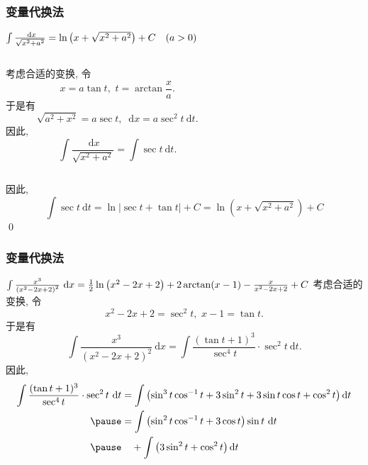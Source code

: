\documentclass[
10pt,
aspectratio=43,
]{beamer}
\begin{document}
\begin{frame}
	\frametitle{变量代换法}
	\everymath{\displaystyle}
	{\small
		\begin{exampleblock}{$\color{black}\int \frac{\mathrm{~d} x}{\sqrt{x^2+a^2}}=\ln \left(x+\sqrt{x^2+a^2}\right)+C \quad(a>0)$}
			\begin{columns}
				\begin{column}{0.4\textwidth}
					\pause 考虑合适的变换, 令
					$$
						x=a \tan t,\,\,t=\arctan\frac{x}{a}.
					$$
					\pause 于是有
					$$
						\sqrt{a^2+x^2} = a\sec t,\,\,\mathrm{~d} x=a \sec ^2 t \mathrm{~d} t.
					$$
					\pause 因此,
					$$
						\int \frac{\mathrm{~d} x}{\sqrt{x^2+a^2}}=\int \sec t \mathrm{~d} t.
					$$
				\end{column}
				\pause 
				\begin{column}{0.5\textwidth}
					\begin{figure}
						\centering
					\end{figure}
				\end{column}
			\end{columns}
			\vspace{0.1cm}
			\pause 
			因此,
			$$
				\int \sec t \mathrm{~d} t= \ln |\sec t+\tan t|+C=\ln \left(x+\sqrt{x^2+a^2}\right)+C
			$$
			\qed
		\end{exampleblock}
	}
\end{frame}

\begin{frame}
	\frametitle{变量代换法}
	\everymath{\displaystyle}
	{\small
		\begin{exampleblock}{$\color{black}\int \frac{x^3}{\left(x^2-2 x+2\right)^2} \mathrm{~d} x=\frac{1}{2} \ln \left(x^2-2 x+2\right)+2 \arctan (x-1)-\frac{x}{x^2-2 x+2}+C$}
			\pause 考虑合适的变换, 令
			$$
				x^2-2 x+2=\sec ^2 t,\,\,x-1=\tan t .
			$$
			\pause 于是有
			$$
				\int \frac{x^3}{\left(x^2-2 x+2\right)^2} \mathrm{~d} x=\int \frac{(\tan t+1)^3}{\sec ^4 t} \cdot \sec ^2 t \mathrm{~d} t.
			$$
			\pause 因此,
			$$
				\begin{aligned}
					\int \frac{(\tan t+1)^3}{\sec ^4 t} \cdot \sec ^2 t \mathrm{~d} t & =\int\left(\sin ^3 t \cos ^{-1} t+3 \sin ^2 t+3 \sin t \cos t+\cos ^2 t\right) \mathrm{d} t \\
					\pause & =\int\left(\sin ^2 t \cos ^{-1} t+3 \cos t\right) \sin t \mathrm{~d} t                      \\
					\pause & \quad +\int\left(3 \sin ^2 t+\cos ^2 t\right) \mathrm{d} t
				\end{aligned}
			$$
		\end{exampleblock}
	}
\end{frame}
\end{document}
